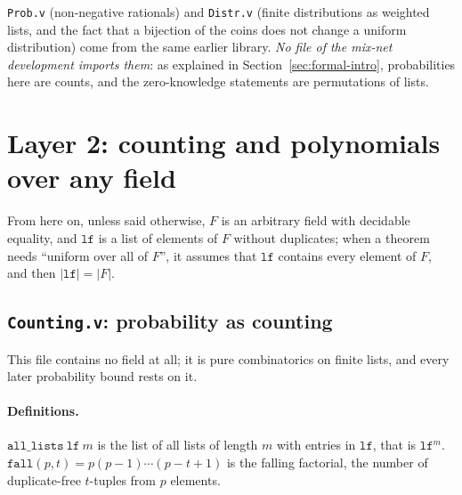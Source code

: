 \documentclass[11pt,a4paper]{article}
\theoremstyle{definition}
\theoremstyle{plain}
\begin{document}
\texttt{Prob.v} (non-negative rationals) and \texttt{Distr.v} (finite distributions as weighted
lists, and the fact that a bijection of the coins does not change a uniform distribution) come from
the same earlier library. \emph{No file of the mix-net development imports them}: as explained in
Section~\ref{sec:formal-intro}, probabilities here are counts, and the zero-knowledge statements
are permutations of lists.

\section{Layer 2: counting and polynomials over any field}
\label{sec:fm-base}

From here on, unless said otherwise, $F$ is an arbitrary field with decidable equality, and
$\mathtt{lf}$ is a list of elements of $F$ without duplicates; when a theorem needs ``uniform over
all of $F$'', it assumes that $\mathtt{lf}$ contains every element of $F$, and then $|\mathtt{lf}|=|F|$.

\subsection{\texttt{Counting.v}: probability as counting}
\label{sec:fm-counting}

This file contains no field at all; it is pure combinatorics on finite lists, and every later
probability bound rests on it.

\paragraph{Definitions.} $\mathtt{all\_lists}\ \mathtt{lf}\ m$ is the list of all lists of length
$m$ with entries in $\mathtt{lf}$, that is $\mathtt{lf}^m$. $\mathtt{fall}(p,t)=p(p-1)\cdots(p-t+1)$
is the falling factorial, the number of duplicate-free $t$-tuples from $p$ elements.
\end{document}
